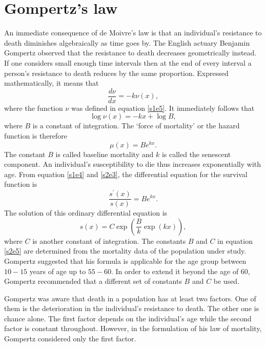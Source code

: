 \documentclass{article}
\numberwithin{equation}{section}
\begin{document}
\section{Gompertz's law}\label{s2}
An immediate consequence of de Moivre's law is that an individual's resistance
to death diminishes algebraically as time goes by. The English actuary 
Benjamin Gompertz observed \cite{gompertz1825xxiv} that the resistance to 
death decreases geometrically instead. If one considers small enough time 
intervals then at the end of every interval a person's resistance to death 
reduces by the same proportion. Expressed mathematically, it means that
\begin{equation}\label{s2e1}
\frac{d\nu}{dx} = -k\nu(x),
\end{equation}
where the function $\nu$ was defined in equation \eqref{s1e5}. It immediately
follows that
\begin{equation}\label{s2e2}
\log\nu(x) = -kx + \log B,
\end{equation}
where $B$ is a constant of integration. The `force of mortality' or the
hazard function is therefore
\begin{equation}\label{s2e3}
\mu(x) = Be^{kx}.
\end{equation}
The constant $B$ is called baseline mortality and $k$ is called the 
senescent component.
An individual's susceptibility to die thus increases exponentially with age.
From equation \eqref{s1e4} and \eqref{s2e3}, the differential equation for
the survival function is
\begin{equation}\label{s2e4}
\frac{s^\prime(x)}{s(x)} = Be^{kx}.
\end{equation}
The solution of this ordinary differential equation is
\begin{equation}\label{s2e5}
s(x) = C\exp\left(\frac{B}{k}\exp(kx)\right),
\end{equation}
where $C$ is another constant of integration. The constants $B$ and $C$ in
equation \eqref{s2e5} are determined from the mortality data of the population
under study. Gompertz suggested that his formula is applicable for the age
group between $10-15$ years of age up to $55-60$. In order to extend it beyond
the age of $60$, Gompertz recommended that a different set of constants $B$
and $C$ be used.

Gompertz was aware that death in a population has at least two factors. One
of them is the deterioration in the individual's resistance to death. The 
other one is chance alone. The first factor depends on the individual's age
while the second factor is constant throughout. However, in the formulation
of his law of mortality, Gompertz considered only the first factor.
\end{document}
